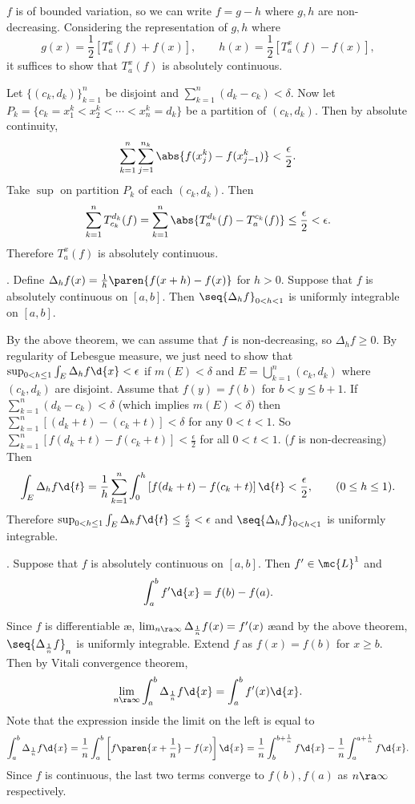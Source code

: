 \pf \(f\) is of bounded variation, so we can write \(f = g - h\) where \(g, h\) are non-decreasing. Considering the representation of \(g, h\) where
\[
    g(x) = \frac{1}{2}\left[T_a^x(f) + f(x)\right], \qquad h(x) = \frac{1}{2}\left[T_a^x(f) - f(x)\right],
\]
it suffices to show that \(T_a^x(f)\) is absolutely continuous.

Let \(\{(c_k, d_k)\}_{k=1}^n\) be disjoint and \(\sum_{k=1}^{n}(d_k - c_k) < \delta\). Now let \(P_k = \{c_k = x_1^k < x_2^k < \cdots < x_n^k = d_k\}\) be a partition of \((c_k, d_k)\). Then by absolute continuity,
\[
    \sum_{k=1}^{n} \sum_{j=1}^{n_k} \abs{f(x_j^k) - f(x_{j-1}^k)} < \frac{\epsilon}{2}.
\]
Take \(\sup\) on partition \(P_k\) of each \((c_k, d_k)\). Then
\[
    \sum_{k=1}^{n}T_{c_k}^{d_k} (f)  = \sum_{k=1}^{n} \abs{T_a^{d_k}(f)- T_a^{c_k}(f)} \leq \frac{\epsilon}{2} < \epsilon.
\]
Therefore \(T_a^x(f)\) is absolutely continuous.

\thm. Define \(\Delta_h f(x) = \frac{1}{h} \paren{f(x+h) - f(x)}\) for \(h > 0\). Suppose that \(f\) is absolutely continuous on \([a, b]\). Then \(\seq{\Delta_h f}_{0<h<1}\) is uniformly integrable on \([a, b]\).

\pf By the above theorem, we can assume that \(f\) is non-decreasing, so \(\Delta_h f \geq 0\). By regularity of Lebesgue measure, we just need to show that \(\sup_{0 < h \leq 1} \int_E \Delta_h f\d{x} < \epsilon\) if \(m(E) < \delta\) and \(E = \bigcup_{k=1}^{n} (c_k, d_k)\) where \((c_k, d_k)\) are disjoint. Assume that \(f(y) = f(b)\) for \(b <y \leq b + 1\). If
\(\sum_{k=1}^{n} (d_k - c_k) < \delta\) (which implies \(m(E) < \delta\)) then \(\sum_{k=1}^{n}\left[(d_k+t) - (c_k+t)\right] < \delta\) for any \(0 < t < 1\). So \(\sum_{k=1}^{n} \left[f(d_k+t) - f(c_k+t)\right] < \frac{\epsilon}{2}\) for all \(0 < t < 1\). (\(f\) is non-decreasing) Then
\[
    \int_E \Delta_h f \d{t} = \frac{1}{h}\sum_{k=1}^{n}\int_{0}^{h} \left[f(d_k + t) - f(c_k + t)\right] \d{t} < \frac{\epsilon}{2}, \qquad (0 \leq h \leq 1).
\]
Therefore \(\sup_{0 < h \leq 1} \int_E \Delta_h f\d{t} \leq \frac{\epsilon}{2} < \epsilon\) and \(\seq{\Delta_h f}_{0 < h < 1}\) is uniformly integrable.

\thm.  Suppose that \(f\) is absolutely continuous on \([a, b]\). Then \(f' \in \mc{L}^{1}\) and
\[
    \int_a^b f' \d{x} = f(b) - f(a).
\]

\pf Since \(f\) is differentiable \ae, \(\lim_{n \ra \infty} \Delta_{\frac{1}{n}} f(x) = f'(x)\) \ae and by the above theorem, \(\seq{\Delta_{\frac{1}{n}} f}_n\) is uniformly integrable. Extend \(f\) as \(f(x) = f(b)\) for \(x \geq b\). Then by Vitali convergence theorem,
\[
    \lim_{n \ra \infty} \int_{a}^{b} \Delta_{\frac{1}{n}} f \d{x} = \int_{a}^{b} f'(x) \d{x}.
\]
Note that the expression inside the limit on the left is equal to
\[
    \int_{a}^{b} \Delta_{\frac{1}{n}} f \d{x} = \frac{1}{n} \int_{a}^{b} \left[f\paren{x + \frac{1}{n}} - f(x)\right] \d{x} = \frac{1}{n}\int_{b}^{b + \frac{1}{n}} f\d{x} - \frac{1}{n} \int_{a}^{a + \frac{1}{n}} f \d{x}.
\]
Since \(f\) is continuous, the last two terms converge to \(f(b), f(a)\) as \(n \ra \infty\) respectively.
\pagebreak
